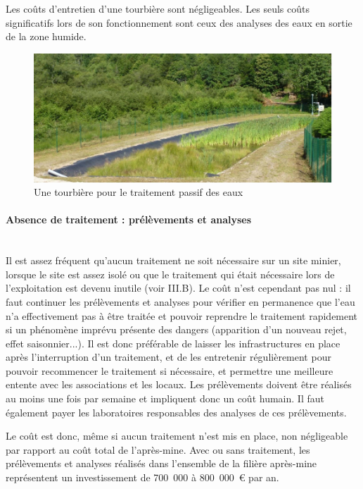 \documentclass{article}
\begin{document}
Les coûts d’entretien d’une tourbière sont négligeables. Les seuls coûts significatifs lors de son fonctionnement sont ceux des analyses des eaux en sortie de la zone humide.

\begin{figure}[H]
\centering
\includegraphics[width=0.7\linewidth]{III_A_4.png}
\caption{Une tourbière pour le traitement passif des eaux}
\label{fig:tourbiere}
\end{figure}


\paragraph{Absence de traitement : prélèvements et analyses \\ \\}

Il est assez fréquent qu’aucun traitement ne soit nécessaire sur un site minier, lorsque le site est assez isolé ou que le traitement qui était nécessaire lors de l’exploitation est devenu inutile (voir III.B). Le coût n’est cependant pas nul : il faut continuer les prélèvements et analyses pour vérifier en permanence que l’eau n’a effectivement pas à être traitée et pouvoir reprendre le traitement rapidement si un phénomène imprévu présente des dangers (apparition d’un nouveau rejet, effet saisonnier...). Il est donc préférable de laisser les infrastructures en place après l'interruption d’un traitement, et de les entretenir régulièrement pour pouvoir recommencer le traitement si nécessaire, et permettre  une meilleure entente avec les associations et les locaux.  Les prélèvements doivent être réalisés au moins une fois par semaine et impliquent donc un coût humain. Il faut également payer les laboratoires responsables des analyses de ces prélèvements.

Le coût est donc, même si aucun traitement n’est mis en place, non négligeable par rapport au coût total de l’après-mine. Avec ou sans traitement, les prélèvements et analyses réalisés dans l’ensemble de la filière après-mine représentent un investissement de 700~000 à 800~000~\euro{} par an.
\end{document}
